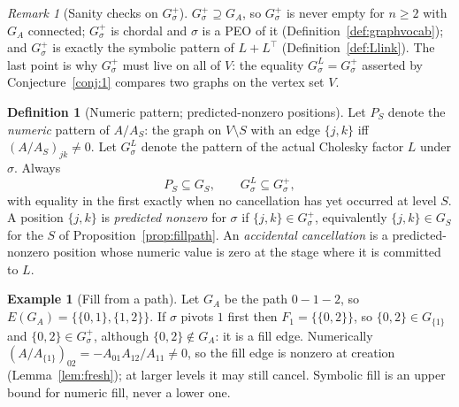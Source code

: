 \documentclass[11pt]{article}
\theoremstyle{plain}
\theoremstyle{definition}
\newtheorem{definition}[theorem]{Definition}
\newtheorem{example}[theorem]{Example}
\theoremstyle{remark}
\newtheorem{remark}[theorem]{Remark}
\begin{document}
\begin{humanaiblock}
\begin{remark}[Sanity checks on $G^+_\sigma$]\label{rem:fill-sanity}
$G^+_\sigma\supseteq G_A$, so $G^+_\sigma$ is never empty for $n\ge2$ with $G_A$ connected;
$G^+_\sigma$ is chordal and $\sigma$ is a PEO of it (Definition~\ref{def:graphvocab}); and
$G^+_\sigma$ is exactly the symbolic pattern of $L+L^\top$ (Definition~\ref{def:Llink}). The last
point is why $G^+_\sigma$ must live on all of $V$: the equality $G^L_\sigma=G^+_\sigma$ asserted by
Conjecture~\ref{conj:1} compares two graphs on the vertex set $V$.
\end{remark}

\begin{definition}[Numeric pattern; predicted-nonzero positions]\label{def:numeric}
Let $P_S$ denote the \emph{numeric} pattern of $A/A_S$: the graph on $V\setminus S$ with an edge
$\{j,k\}$ iff $(A/A_S)_{jk}\neq0$. Let $G^L_\sigma$ denote the pattern of the actual Cholesky factor
$L$ under $\sigma$. Always
\[
P_S\subseteq G_S,\qquad G^L_\sigma\subseteq G^+_\sigma,
\]
with equality in the first exactly when no cancellation has yet occurred at level $S$. A position
$\{j,k\}$ is \emph{predicted nonzero} for $\sigma$ if $\{j,k\}\in G^+_\sigma$, equivalently
$\{j,k\}\in G_S$ for the $S$ of Proposition~\ref{prop:fillpath}. An \emph{accidental cancellation} is
a predicted-nonzero position whose numeric value is zero at the stage where it is committed to $L$.
\end{definition}

\begin{example}[Fill from a path]\label{ex:fill-path}
Let $G_A$ be the path $0-1-2$, so $E(G_A)=\{\{0,1\},\{1,2\}\}$. If $\sigma$ pivots $1$ first then
$F_1=\{\{0,2\}\}$, so $\{0,2\}\in G_{\{1\}}$ and $\{0,2\}\in G^+_\sigma$, although
$\{0,2\}\notin G_A$: it is a fill edge. Numerically
$(A/A_{\{1\}})_{02}=-A_{01}A_{12}/A_{11}\neq0$, so the fill edge is nonzero at creation
(Lemma~\ref{lem:fresh}); at larger levels it may still cancel. Symbolic fill is an upper bound for
numeric fill, never a lower one.
\end{example}
\end{humanaiblock}
\end{document}
